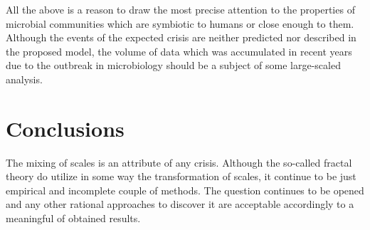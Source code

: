 \documentclass[a4paper]{article}
\begin{document}
All the above is a reason to draw the most precise attention to the properties of microbial communities which are symbiotic to humans or close enough to them. Although the events of the expected crisis are neither predicted nor described in the proposed model, the volume of data which was accumulated in recent years due to the outbreak in microbiology should be a subject of some large-scaled analysis. 








\section*{Conclusions}

The mixing of scales is an attribute of any crisis. Although the so-called fractal theory do utilize in some way the transformation of scales, it continue to be just empirical and incomplete couple of methods. The question continues to be opened and any other rational approaches to discover it are acceptable accordingly to a meaningful of obtained results.
\end{document}
